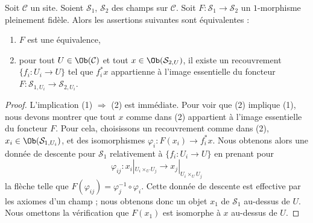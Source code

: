 \begin{lemma}
\label{lemma-characterize-essentially-surjective-when-ff}
Soit $\mathcal{C}$ un site.
Soient $\mathcal{S}_1$, $\mathcal{S}_2$ des champs sur $\mathcal{C}$.
Soit $F : \mathcal{S}_1 \to \mathcal{S}_2$ un $1$-morphisme
pleinement fidèle. Alors les assertions suivantes sont équivalentes :
\begin{enumerate}
\item $F$ est une équivalence,
\item pour tout $U \in \Ob(\mathcal{C})$ et tout
$x \in \Ob(\mathcal{S}_{2, U})$, il existe un recouvrement
$\{f_i : U_i \to U\}$ tel que $f_i^*x$ appartienne à l'image essentielle
du foncteur $F : \mathcal{S}_{1, U_i} \to \mathcal{S}_{2, U_i}$.
\end{enumerate}
\end{lemma}

\begin{proof}
L'implication (1) $\Rightarrow$ (2) est immédiate.
Pour voir que (2) implique (1), nous devons montrer que tout
$x$ comme dans (2) appartient à l'image essentielle du foncteur $F$.
Pour cela, choisissons un recouvrement comme dans (2),
$x_i \in \Ob(\mathcal{S}_{1, U_i})$, et des
isomorphismes $\varphi_i : F(x_i) \to f_i^*x$. Nous obtenons alors une donnée de
descente pour $\mathcal{S}_1$ relativement à $\{f_i : U_i \to U\}$
en prenant pour
$$
\varphi_{ij} :
x_i|_{U_i \times_U U_j}
\longrightarrow
x_j|_{U_i \times_U U_j}
$$
la flèche telle que $F(\varphi_{ij}) = \varphi_j^{-1} \circ \varphi_i$.
Cette donnée de descente est effective par les axiomes d'un champ ; nous
obtenons donc un objet $x_1$ de $\mathcal{S}_1$ au-dessus de $U$. Nous omettons la
vérification que $F(x_1)$ est isomorphe à $x$ au-dessus de $U$.
\end{proof}

